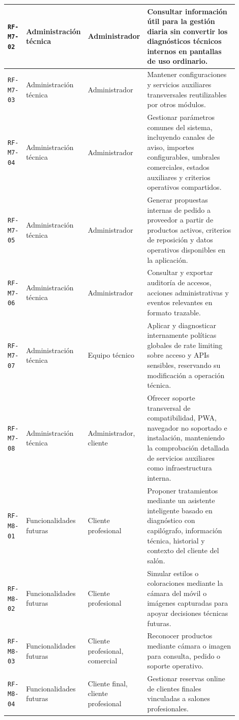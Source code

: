 {\begin{supertabular}{|>{\raggedright\arraybackslash}p{0.085\linewidth}|>{\raggedright\arraybackslash}p{0.205\linewidth}|>{\raggedright\arraybackslash}p{0.18\linewidth}|>{\raggedright\arraybackslash}p{0.43\linewidth}|}
\hline
\texttt{RF-M7-02} & Administración técnica & Administrador & Consultar información útil para la gestión diaria sin convertir los diagnósticos técnicos internos en pantallas de uso ordinario. \\
\hline
\texttt{RF-M7-03} & Administración técnica & Administrador & Mantener configuraciones y servicios auxiliares transversales reutilizables por otros módulos. \\
\hline
\texttt{RF-M7-04} & Administración técnica & Administrador & Gestionar parámetros comunes del sistema, incluyendo canales de aviso, importes configurables, umbrales comerciales, estados auxiliares y criterios operativos compartidos. \\
\hline
\texttt{RF-M7-05} & Administración técnica & Administrador & Generar propuestas internas de pedido a proveedor a partir de productos activos, criterios de reposición y datos operativos disponibles en la aplicación. \\
\hline
\texttt{RF-M7-06} & Administración técnica & Administrador & Consultar y exportar auditoría de accesos, acciones administrativas y eventos relevantes en formato trazable. \\
\hline
\texttt{RF-M7-07} & Administración técnica & Equipo técnico & Aplicar y diagnosticar internamente políticas globales de rate limiting sobre acceso y APIs sensibles, reservando su modificación a operación técnica. \\
\hline
\texttt{RF-M7-08} & Administración técnica & Administrador, cliente & Ofrecer soporte transversal de compatibilidad, PWA, navegador no soportado e instalación, manteniendo la comprobación detallada de servicios auxiliares como infraestructura interna. \\
\hline
{}
\texttt{RF-M8-01} & Funcionalidades futuras & Cliente profesional & Proponer tratamientos mediante un asistente inteligente basado en diagnóstico con capilógrafo, información técnica, historial y contexto del cliente del salón. \\
\hline
\texttt{RF-M8-02} & Funcionalidades futuras & Cliente profesional & Simular estilos o coloraciones mediante la cámara del móvil o imágenes capturadas para apoyar decisiones técnicas futuras. \\
\hline
\texttt{RF-M8-03} & Funcionalidades futuras & Cliente profesional, comercial & Reconocer productos mediante cámara o imagen para consulta, pedido o soporte operativo. \\
\hline
\texttt{RF-M8-04} & Funcionalidades futuras & Cliente final, cliente profesional & Gestionar reservas online de clientes finales vinculadas a salones profesionales. \\

\end{supertabular}}
